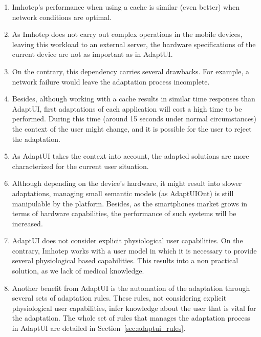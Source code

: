 \begin{enumerate}[label=\alph*]
  \item Imhotep's performance when using a cache is similar (even better) when
  network conditions are optimal. 
  
  \item As Imhotep does not carry out complex operations in the mobile devices,
  leaving this workload to an external server, the hardware specifications of 
  the current device are not as important as in AdaptUI.
  
  \item On the contrary, this dependency carries several drawbacks. For 
  example, a network failure would leave the adaptation process incomplete.
  
  \item Besides, although working with a cache results in similar time responses
  than AdaptUI, first adaptations of each application will cost a high time to
  be performed. During this time (around 15 seconds under normal circumstances)
  the context of the user might change, and it is possible for the user to 
  reject the adaptation.
  
  \item As AdaptUI takes the context into account, the adapted solutions are
  more characterized for the current user situation.
  
  \item Although depending on the device's hardware, it might result into slower
  adaptations, managing small semantic models (as AdaptUIOnt) is still 
  manipulable by the platform. Besides, as the smartphones market grows in terms
  of hardware capabilities, the performance of such systems will be increased.
  
  \item AdaptUI does not consider explicit physiological user capabilities. On 
  the contrary, Imhotep works with a user model in which it is necessary to
  provide several physiological based capabilities. This results into a non
  practical solution, as we lack of medical knowledge.
  
  \item Another benefit from AdaptUI is the automation of the adaptation 
  through several sets of adaptation rules. These rules, not considering 
  explicit physiological user capabilities, infer knowledge about the user that
  is vital for the adaptation. The whole set of rules that manages the adaptation
  process in AdaptUI are detailed in Section~\ref{sec:adaptui_rules}.
\end{enumerate}